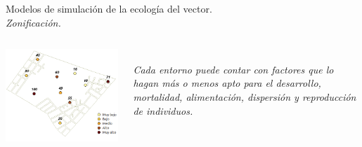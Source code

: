\begin{frame}[c]{Modelos de simulación de la ecología del vector.\\\textit{Zonificación.}}

  \begin{center}
   \begin{columns}[T]
        \begin{column}[T]{4cm}
              \includegraphics[width=\textwidth]{../book/capitulo-5/graphics/cartografia-vector.png}
        \end{column}
        \begin{column}[T]{6cm}
          \textit{\\Cada entorno puede contar con factores que lo hagan más o menos apto para el desarrollo, mortalidad, alimentación, dispersión y reproducción de individuos.}
        \end{column}
    \end{columns}
  \end{center}
\end{frame}

